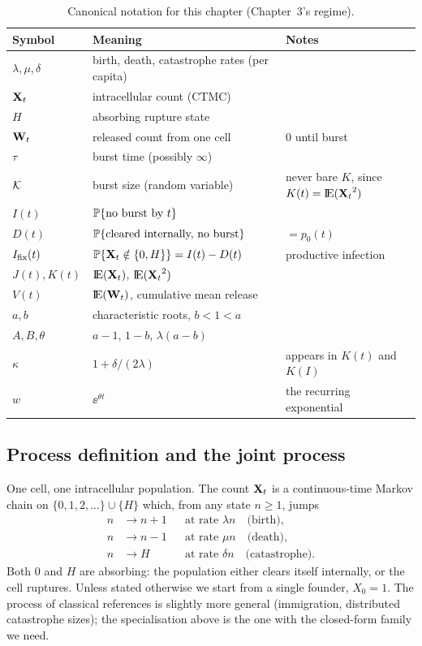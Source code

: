 \begin{table}[H]
\centering
\renewcommand{\arraystretch}{1.25}
\small
\begin{tabular}{@{}llp{}@{}}
\toprule
Symbol & Meaning & Notes \\
\midrule
$\lambda,\mu,\delta$ & birth, death, catastrophe rates (per capita) & \\
${{\bf X}_t}$ & intracellular count (CTMC) & \\
$H$ & absorbing rupture state & \\
${{\bf W}_t}$ & released count from one cell & $0$ until burst \\
$\tau$ & burst time (possibly $\infty$) & \\
$\mathcal{K}$ & burst size (random variable) & never bare $K$, since $K(t)={\rm I}\!{\rm E}({{\bf X}_t}^2)$ \\
$I(t)$ & $\mathbb{P}\!\left\{\text{no burst by }t\right\}$ & \\
$D(t)$ & $\mathbb{P}\!\left\{\text{cleared internally, no burst}\right\}$ & $= p_0(t)$ \\
$I_{\mathrm{fix}}(t)$ & $\mathbb{P}\!\left\{{{\bf X}_t}\notin\{0,H\}\right\} = I(t)-D(t)$ & productive infection \\
$J(t),K(t)$ & ${\rm I}\!{\rm E}({{\bf X}_t})$, ${\rm I}\!{\rm E}({{\bf X}_t}^2)$ & \\
$V(t)$ & ${\rm I}\!{\rm E}({{\bf W}_t})$, cumulative mean release & \\
$a,b$ & characteristic roots, $b<1<a$ & \\
$A,B,\theta$ & $a-1$, $1-b$, $\lambda(a-b)$ & \\
$\kappa$ & $1+\delta/(2\lambda)$ & appears in $K(t)$ and $K(I)$ \\
$w$ & $\ee^{\theta t}$ & the recurring exponential \\
\bottomrule
\end{tabular}
\caption{Canonical notation for this chapter (Chapter~3's regime).}
\label{tab:notation}
\end{table}

\subsection{Process definition and the joint process}

One cell, one intracellular population. The count ${{\bf X}_t}$ is a continuous-time
Markov chain on $\{0,1,2,\ldots\}\cup\{H\}$ which, from any state $n\ge1$,
jumps
\begin{align*}
n &\to n+1 &&\text{at rate } \lambda n \quad\text{(birth)},\\
n &\to n-1 &&\text{at rate } \mu n \quad\text{(death)},\\
n &\to H &&\text{at rate } \delta n \quad\text{(catastrophe)}.
\end{align*}
Both $0$ and $H$ are absorbing: the population either clears itself
internally, or the cell ruptures. Unless stated otherwise we start from a
single founder, $X_0=1$. The process of classical references
\cite{brockwell1982birth,karlin1982linear,di2008note} is slightly more
general (immigration, distributed catastrophe sizes); the specialisation
above is the one with the closed-form family we need.

